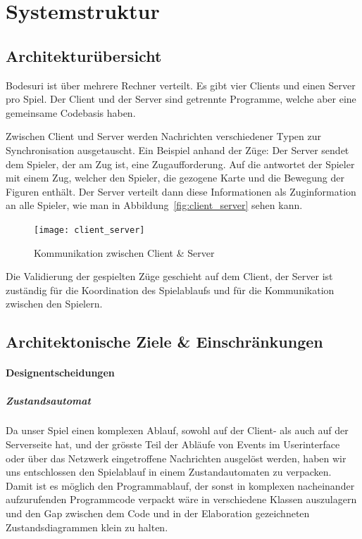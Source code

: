 \documentclass[12pt,halfparskip]{scrartcl}
\begin{document}


\section{Systemstruktur} %
\label{Systemstruktur}

\subsection{Architekturübersicht} %
\label{sub:architekturuebersicht}

Bodesuri ist über mehrere Rechner verteilt. Es gibt vier Clients und einen Server pro Spiel. Der Client und der Server sind getrennte Programme, welche aber eine gemeinsame Codebasis haben.

Zwischen Client und Server werden Nachrichten verschiedener Typen zur Synchronisation ausgetauscht. Ein Beispiel anhand der Züge: Der Server sendet dem Spieler, der am Zug ist, eine Zugaufforderung. Auf die antwortet der Spieler mit einem Zug, welcher den Spieler, die gezogene Karte und die Bewegung der Figuren enthält. Der Server verteilt dann diese Informationen als Zuginformation an alle Spieler, wie man in Abbildung~\vref{fig:client_server} sehen kann.

\begin{figure}[h]
	\centering
	\texttt{[image: client\_server]}
	\caption{Kommunikation zwischen Client \& Server}
	\label{fig:client_server}
\end{figure}

Die Validierung der gespielten Züge geschieht auf dem Client, der Server ist zuständig für die Koordination des Spielablaufs und für die Kommunikation zwischen den Spielern.

\subsection{Architektonische Ziele \& Einschränkungen} %
\label{sub:architektonische_ziele_einschraenkungen}
\paragraph{Designentscheidungen}\label{ssub:designentscheidungen} %
\subparagraph{Zustandsautomat} %
\label{ssub:zustandsautomat}
Da unser Spiel einen komplexen Ablauf, sowohl auf der Client- als auch auf der Serverseite hat, und der grösste Teil der Abläufe von Events im Userinterface oder über das Netzwerk eingetroffene Nachrichten ausgelöst werden, haben wir uns entschlossen den Spielablauf in einem Zustandautomaten zu verpacken.
Damit ist es möglich den Programmablauf, der sonst in komplexen nacheinander aufzurufenden Programmcode verpackt wäre in verschiedene Klassen auszulagern und den Gap zwischen dem Code und in der Elaboration gezeichneten Zustandsdiagrammen klein zu halten.
\end{document}
